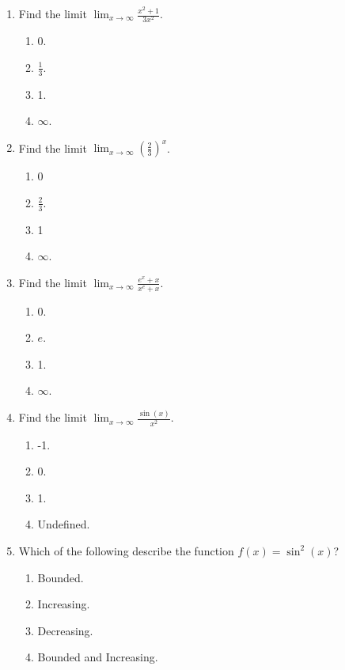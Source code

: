 \documentclass{article}
\begin{document}
\begin{enumerate}

  \item Find the limit $\displaystyle \lim_{x\to\infty} \frac{x^2+1}{3x^2}$.
  \begin{enumerate}
    \item 0.
    \item $\frac{1}{3}$. %
    \item 1.
    \item $\infty$.
  \end{enumerate}
  
  \item Find the limit $\displaystyle \lim_{x\to\infty} \left(\frac{2}{3}\right)^x$.
  \begin{enumerate}
    \item 0 %
    \item $\frac{2}{3}$. 
    \item 1
    \item $\infty$.
  \end{enumerate}
  
  \item Find the limit $\displaystyle \lim_{x\to\infty} \frac{e^x+x}{x^e+x}$.
  \begin{enumerate}
    \item 0. 
    \item $e$. 
    \item 1.
    \item $\infty$. %
  \end{enumerate}

  
  \item Find the limit $\displaystyle \lim_{x\to\infty} \frac{\sin(x)}{x^2}$.
  \begin{enumerate}
    \item -1. 
    \item 0. %
    \item 1.
    \item Undefined. 
  \end{enumerate}

  \item Which of the following describe the function $f(x)=\sin^2(x)$?
  \begin{enumerate}
    \item Bounded. %
    \item Increasing. 
    \item Decreasing.
    \item Bounded and Increasing. 
  \end{enumerate}
  

\end{enumerate}
\end{document}
